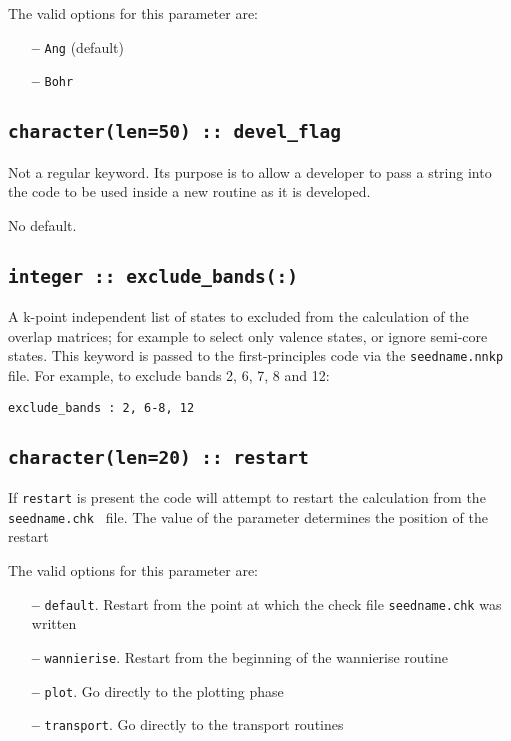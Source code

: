 The valid options for this parameter are:
\begin{itemize}
\item[{\bf --}]  \verb#Ang# (default)
\item[{\bf --}]  \verb#Bohr#
\end{itemize}

\subsection[devel\_flag]{\tt character(len=50) :: devel\_flag}

Not a regular keyword. Its purpose is to allow a developer to pass a
string into the code to be used inside a new routine as it is developed.

No default.

%
%


\subsection[exclude\_bands]{\tt integer :: exclude\_bands(:)}

A k-point independent list of states to excluded from the calculation
 of the overlap matrices; 
 for example to select only valence states, or ignore semi-core states.
 This keyword is passed to the first-principles code via the
 {\tt seedname.nnkp} file. For example, to exclude bands 2, 6, 7, 8
 and 12:

 \verb#exclude_bands : 2, 6-8, 12# 

\subsection[restart]{\tt character(len=20) :: restart}

If \verb#restart# is present the code will attempt to restart the calculation
from the {\tt seedname.chk } file. The value of the parameter
determines the position of the restart

The valid options for this parameter are:
\begin{itemize}
\item[{\bf --}]  \verb#default#. Restart from the point at which the
  check file {\tt seedname.chk} was written  
\item[{\bf --}]  \verb#wannierise#. Restart from the beginning of the
  wannierise routine 
\item[{\bf --}]  \verb#plot#. Go directly to the plotting phase 
\item[{\bf --}]  \verb#transport#. Go directly to the transport routines


\end{itemize}




